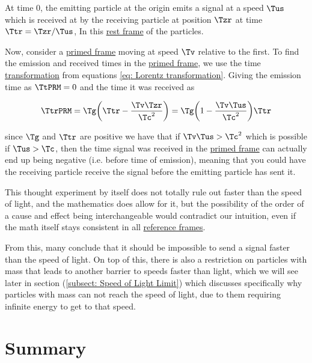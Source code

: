 At time $0$, the emitting particle at the origin emits a signal at a speed $\Tus$ which is received at by the receiving particle at position $\Tzr$ at time $\Ttr=\Tzr/\Tus$, In this \hyperlink{def-proper-frame}{rest frame} of the particles.

Now, consider a \hyperlink{def-Primed-Frame}{primed frame} moving at speed $\Tv$ relative to the first.
To find the emission and received times in the \hyperlink{def-Primed-Frame}{primed frame}, we use the time \hyperlink{def-transform}{transformation} from equations \eqref{eq: Lorentz transformation}.
Giving the emission time as $\TtPRM=0$ and the time it was received as

\begin{equation}
\TtrPRM= \Tg  \bigg( \Ttr -\frac{ {\Tv }{\Tzr } }{ \Tc ^2}\bigg) = \Tg  \bigg(1  -\frac{ {\Tv }{\Tus } }{ \Tc ^2}\bigg) \Ttr
\end{equation}

since $\Tg$ and $\Ttr$ are positive we have that if ${\Tv }{\Tus }>\Tc^2$ which is possible if $\Tus>\Tc$, then the time signal was received in the \hyperlink{def-Primed-Frame}{primed frame} can actually end up being negative (i.e. before time of emission), meaning that you could have the receiving particle receive the signal before the emitting particle has sent it.

This thought experiment by itself does not totally rule out faster than the speed of light, and the mathematics does allow for it, but the possibility of the order of a cause and effect being interchangeable would contradict our intuition, even if the math itself stays consistent in all \hyperlink{def-Reference-frame}{reference frames}.

From this, many conclude that it should be impossible to send a signal faster than the speed of light.
On top of this, there is also a restriction on particles with mass that leads to another barrier to speeds faster than light, which we will see later in section (\ref{subsect: Speed of Light Limit}) which discusses specifically why particles with mass can not reach the speed of light, due to them requiring infinite energy to get to that speed.

\section{Summary}\label{sect: Summary chapter 2}

